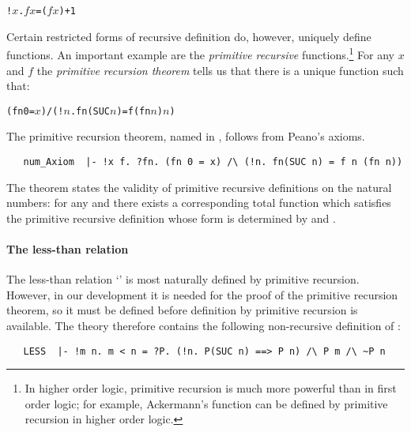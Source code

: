 \begin{alltt}
   !\(x\). \(f\) \(x\) = (\(f\) \(x\)) + 1
\end{alltt}
Certain restricted forms of recursive
%
%
definition do, however, uniquely define functions. An important
example are the \emph{primitive recursive} functions.\footnote{In
  higher order logic, primitive recursion is much more powerful than
  in first order logic; for example, Ackermann's function can be
  defined by primitive recursion in higher order logic.} For any $x$
and $f$ the \emph{primitive recursion theorem} tells us that there is
a unique function  such that:

\begin{alltt}
   (fn 0 = \(x\)) /\bs (!\(n\). fn(SUC \(n\)) = f (fn \(n\)) \(n\))
\end{alltt}

The primitive recursion theorem, named  in \HOL,
follows from Peano's
%
%
axioms.

\begin{hol}
\begin{verbatim}
   num_Axiom  |- !x f. ?fn. (fn 0 = x) /\ (!n. fn(SUC n) = f n (fn n))
\end{verbatim}
\end{hol}

\noindent The theorem states the validity of primitive recursive
definitions on the natural numbers: for any  and  there exists a
corresponding total function  which satisfies
the primitive recursive definition whose form is determined by  and
.

\paragraph{The less-than relation}

The less-than relation `\holtxt{<}'
is most naturally defined by primitive recursion. However, in our
development it is needed for the proof of the
  primitive recursion theorem, so it must be defined before definition
  by primitive recursion is available. The theory 
  therefore contains the following non-recursive definition of \ml{<}:

\begin{hol}
\begin{verbatim}
   LESS  |- !m n. m < n = ?P. (!n. P(SUC n) ==> P n) /\ P m /\ ~P n
\end{verbatim}
\end{hol}

